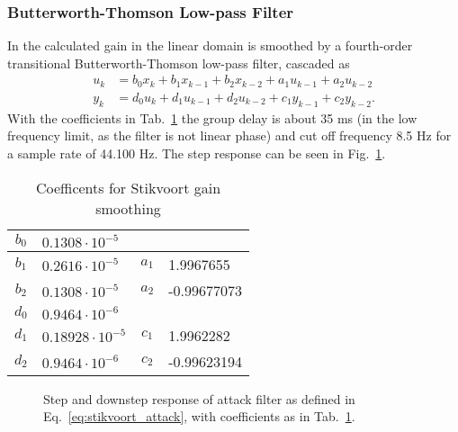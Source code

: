\documentclass[../main2.tex]{subfiles}
\providecommand{\rootdir}{..}
\begin{document}
\subsubsection{Butterworth-Thomson Low-pass Filter}
In \cite{stikvoort1986digital} the calculated gain in the linear domain is smoothed by a fourth-order transitional Butterworth-Thomson low-pass filter, cascaded as
\begin{equation}\label{eq:stikvoort_attack}
\begin{split}
u_k &= b_0 x_k + b_1 x_{k-1} + b_2 x_{k-2} + a_1 u_{k-1} + a_2 u_{k-2}\\
y_k &= d_0 u_k + d_1 u_{k-1} + d_2 u_{k-2} + c_1 y_{k-1} + c_2 y_{k-2}.
\end{split}
\end{equation}
With the coefficients in Tab.~\ref{tab:coeff_stikvoort_attack}  the group delay is about 35 ms (in the low frequency limit, as the filter is not linear phase) and cut off frequency 8.5 Hz for a sample rate of 44.100 Hz. The step response can be seen in Fig.~\ref{fig:step_stikvoort_attack}. 
\begin{table}[h]
\begin{center}
\caption{Coefficents for Stikvoort gain smoothing}
\label{tab:coeff_stikvoort_attack}
 \begin{tabular}{ c l | c l}	
    \hline
    $b_0$ & $0.1308 \cdot 10^{-5}$ &              &                          \\ \hline
    $b_1$ & $0.2616 \cdot 10^{-5}$ & $a_1$ & 1.9967655     \\ \hline
    $b_2$ & $0.1308 \cdot 10^{-5}$ & $a_2$ & -0.99677073  \\ \hline \hline

    $d_0$ & $0.9464  \cdot 10^{-6}$   &         &                             \\ \hline
    $d_1$ & $0.18928 \cdot 10^{-5}$ & $c_1$ & 1.9962282     \\ \hline
    $d_2$ & $0.9464  \cdot 10^{-6}$  & $c_2$ & -0.99623194  \\ \hline
\end{tabular}
\end{center}
\end{table}
\begin{figure}
\centerline{}
\caption{Step and downstep response of attack filter as defined in Eq.~\eqref{eq:stikvoort_attack}, with coefficients as in Tab.~\ref{tab:coeff_stikvoort_attack}.}
\label{fig:step_stikvoort_attack}
\end{figure}
\end{document}
